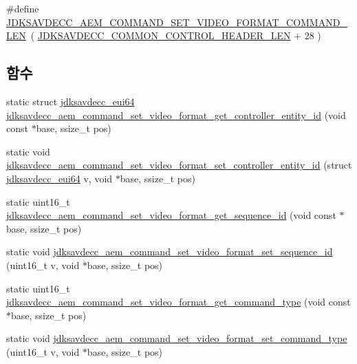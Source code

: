 \begin{DoxyCompactItemize}
\item 
\#define \hyperlink{group__command__set__video__format_ga749abf27446db425e799ee63bab7b4ef}{J\+D\+K\+S\+A\+V\+D\+E\+C\+C\+\_\+\+A\+E\+M\+\_\+\+C\+O\+M\+M\+A\+N\+D\+\_\+\+S\+E\+T\+\_\+\+V\+I\+D\+E\+O\+\_\+\+F\+O\+R\+M\+A\+T\+\_\+\+C\+O\+M\+M\+A\+N\+D\+\_\+\+L\+EN}~( \hyperlink{group__jdksavdecc__avtp__common__control__header_gaae84052886fb1bb42f3bc5f85b741dff}{J\+D\+K\+S\+A\+V\+D\+E\+C\+C\+\_\+\+C\+O\+M\+M\+O\+N\+\_\+\+C\+O\+N\+T\+R\+O\+L\+\_\+\+H\+E\+A\+D\+E\+R\+\_\+\+L\+EN} + 28 )
\end{DoxyCompactItemize}
\subsection*{함수}
\begin{DoxyCompactItemize}
\item 
static struct \hyperlink{structjdksavdecc__eui64}{jdksavdecc\+\_\+eui64} \hyperlink{group__command__set__video__format_ga0346fdee8580fbdf1c40ef625c92f158}{jdksavdecc\+\_\+aem\+\_\+command\+\_\+set\+\_\+video\+\_\+format\+\_\+get\+\_\+controller\+\_\+entity\+\_\+id} (void const $\ast$base, ssize\+\_\+t pos)
\item 
static void \hyperlink{group__command__set__video__format_gab332a344fe6f8917fe9f662f906d876c}{jdksavdecc\+\_\+aem\+\_\+command\+\_\+set\+\_\+video\+\_\+format\+\_\+set\+\_\+controller\+\_\+entity\+\_\+id} (struct \hyperlink{structjdksavdecc__eui64}{jdksavdecc\+\_\+eui64} v, void $\ast$base, ssize\+\_\+t pos)
\item 
static uint16\+\_\+t \hyperlink{group__command__set__video__format_ga28785e4f7aba3899f3b7171c4fa53de0}{jdksavdecc\+\_\+aem\+\_\+command\+\_\+set\+\_\+video\+\_\+format\+\_\+get\+\_\+sequence\+\_\+id} (void const $\ast$base, ssize\+\_\+t pos)
\item 
static void \hyperlink{group__command__set__video__format_gac9fa5a307f89aa819a7985c458a566c6}{jdksavdecc\+\_\+aem\+\_\+command\+\_\+set\+\_\+video\+\_\+format\+\_\+set\+\_\+sequence\+\_\+id} (uint16\+\_\+t v, void $\ast$base, ssize\+\_\+t pos)
\item 
static uint16\+\_\+t \hyperlink{group__command__set__video__format_ga25727d63706257b50fce0289dba147fd}{jdksavdecc\+\_\+aem\+\_\+command\+\_\+set\+\_\+video\+\_\+format\+\_\+get\+\_\+command\+\_\+type} (void const $\ast$base, ssize\+\_\+t pos)
\item 
static void \hyperlink{group__command__set__video__format_gad436a3761e3e4868215466cd03c99f53}{jdksavdecc\+\_\+aem\+\_\+command\+\_\+set\+\_\+video\+\_\+format\+\_\+set\+\_\+command\+\_\+type} (uint16\+\_\+t v, void $\ast$base, ssize\+\_\+t pos)

\end{DoxyCompactItemize}
